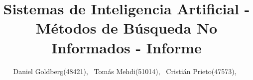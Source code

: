 \documentclass[10pt,journal,compsoc]{IEEEtran}
\begin{document}
%
\title{Sistemas de Inteligencia Artificial - M\'etodos de B\'usqueda No Informados - Informe}
%
%
%
%

\author{Daniel Goldberg(48421),~
        Tom\'as Mehdi(51014),~
	Cristi\'an Prieto(47573),~
}
\end{document}
